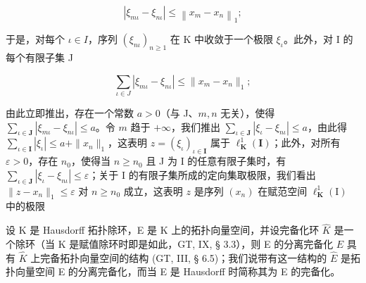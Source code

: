 \[
\left| \xi_ {m\iota} - \xi_ {n\iota} \right| \leqslant \left\| x _ {m} - x _ {n} \right\| _ {1};
\]

于是，对每个 \(\iota \in I\)，序列 \((\xi_{n\iota})_{n\geqslant 1}\) 在 K 中收敛于一个极限 \(\xi_{\iota}\)。此外，对 I 的每个有限子集 J

\[
\sum_ {\iota \in J} | \xi_ {m\iota} - \xi_ {n\iota} | \leqslant \| x _ {m} - x _ {n} \| _ {1};
\]

由此立即推出，存在一个常数 \(a > 0\)（与 J、\(m, n\) 无关），使得 \(\sum_{\iota \in \mathbf{J}} |\xi_{m\iota} - \xi_{n\iota}| \leqslant a\)。令 \(m\) 趋于 \(+\infty\)，我们推出 \(\sum_{\iota \in \mathbf{J}} |\xi_{\iota} - \xi_{n\iota}| \leqslant a\)，由此得 \(\sum_{\iota \in \mathbf{I}} |\xi_{\iota}| \leqslant a + \| x_n\|_1\)，这表明 \(z = (\xi_{\iota})_{\iota \in \mathbf{I}}\) 属于 \(\ell_{\mathbf{K}}^1 (\mathbf{I})\)；此外，对所有 \(\varepsilon > 0\)，存在 \(n_0\)，使得当 \(n \geqslant n_0\) 且 J 为 I 的任意有限子集时，有 \(\sum_{\iota \in \mathbf{J}} |\xi_{\iota} - \xi_{n\iota}| \leqslant \varepsilon\)；关于 I 的有限子集所成的定向集取极限，我们看出 \(\| z - x_n\| _1\leqslant \varepsilon\) 对 \(n\geqslant n_0\) 成立，这表明 \(z\) 是序列 \((x_{n})\) 在赋范空间 \(\ell_{\mathbf{K}}^{1}(\mathrm{I})\) 中的极限

设 K 是 Hausdorff 拓扑除环，E 是 K 上的拓扑向量空间，并设完备化环 \(\hat{K}\) 是一个除环（当 K 是赋值除环时即是如此，GT, IX, § 3.3），则 E 的分离完备化 \(\hat{E}\) 具有 \(\hat{K}\) 上完备拓扑向量空间的结构 (GT, III, § 6.5)；我们说带有这一结构的 \(\hat{E}\) 是拓扑向量空间 E 的分离完备化，而当 E 是 Hausdorff 时简称其为 E 的完备化。

